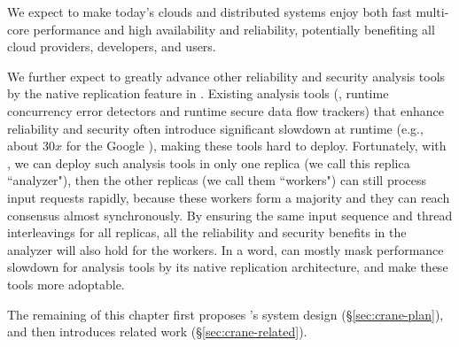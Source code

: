 We expect \crane to make today's clouds and distributed systems enjoy both
fast multi-core performance and high availability and reliability, potentially
benefiting all cloud providers, developers, and users.

We further expect \crane to greatly advance other reliability and security
analysis tools by the native replication feature in \crane. Existing analysis
tools (\eg, runtime concurrency error detectors and runtime secure data flow
trackers) that enhance reliability and security often introduce significant
slowdown at runtime (e.g., about 30$x$ for the Google \threadsanitizer), making
these tools hard to deploy. Fortunately, with \crane, we can deploy such
analysis tools in only one replica (we call this replica ``analyzer"), then the
other replicas (we call them ``workers") can still process input requests
rapidly, because these workers form a majority and they can reach consensus
almost synchronously. By ensuring the same input sequence and thread
interleavings for all replicas, all the reliability and security benefits in the
analyzer will also hold for the workers. In a word, \crane can mostly mask
performance slowdown for analysis tools by its native replication architecture,
and make these tools more adoptable.

The remaining of this chapter first proposes \crane's system
design (\S\ref{sec:crane-plan}), and then introduces related
work (\S\ref{sec:crane-related}).
